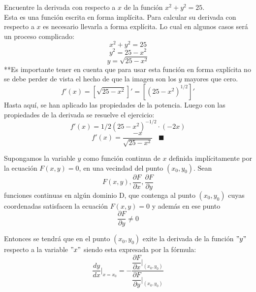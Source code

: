 \documentclass[10pt,twoside]{SelfArx} %
\begin{document}
\begin{ejemplo}
Encuentre la derivada con respecto a $ x $ de la función $ x^{2}+y^{2}=25 $.\\
Esta es una función escrita en forma implícita. Para calcular su derivada con respecto a $ x $ es necesario llevarla a forma explícita. Lo cual en algunos casos será un proceso complicado:
\begin{equation}
 x^{2}+y^{2}=25 
\end{equation}
\begin{equation}
 y^{2}=25-x^{2} 
\end{equation}
\begin{equation}
 y=\sqrt{25-x^{2}} 
\end{equation}
**Es importante tener en cuenta que para usar esta función en forma explícita no se debe perder de vista el hecho de que la imagen son los $ y $ mayores que cero.
\begin{equation}
 f'(x)=\left[\sqrt{25-x^{2}}\right ]'=\left[(25-x^{2})^{1/2}\right]' 
\end{equation}
Hasta aquí, se han aplicado las propiedades de la potencia. Luego con las propiedades de la derivada se resuelve el ejercicio:
\begin{equation}
 f'(x)=1/2(25-x^{2})^{-1/2}\cdot (-2x) 
\end{equation}
\begin{equation}
 f'(x)=\frac{-x}{\sqrt{25-x^{2}}} \;\;\; \blacksquare 
\end{equation}

\end{ejemplo}
 
\begin{teorema}
Supongamos la variable $ y $ como función continua de $ x $ definida implícitamente por la ecuación $ F(x,y)=0 $, en una vecindad del punto $ (x_{0}, y_{0}). $ Sean 
\begin{equation}
 F(x,y), \dfrac{\partial F}{\partial x}, \dfrac{\partial F}{\partial y} 
\end{equation}
funciones continuas en algún dominio D, que contenga al punto $ (x_{0}, y_{0}) $ cuyas coordenadas satisfacen la ecuación $ F(x,y)=0 $ y además en ese punto
\begin{equation}
  \dfrac{\partial F}{\partial y}\neq0  
\end{equation}

Entonces se tendrá que en el punto $ (x_{0}, y_{0}) $ exite la derivada de la función $" y "$ respecto a la variable $ "x" $ siendo esta expresada por la fórmula:
\begin{equation}\label{funcion_implicita}
 \frac{dy}{dx}\Bigg|_{x=x_{0}}=-\dfrac{\dfrac{\partial F}{\partial x}\Bigg|_{(x_{0}, y_{0})}}{\dfrac{\partial F}{\partial y}\Bigg|_{(x_{0}, y_{0})}} 
\end{equation}
	
\end{teorema}
\end{document}
